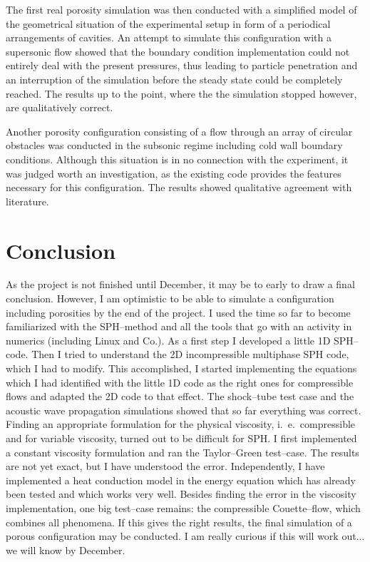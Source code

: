 \documentclass{report}
\begin{document}
The first real porosity simulation was then conducted with a simplified model of the geometrical situation of the experimental setup in form of a periodical arrangements of cavities. An attempt to simulate this configuration with a supersonic flow showed that the boundary condition implementation could not entirely deal with the present pressures, thus leading to particle penetration and an interruption of the simulation before the steady state could be completely reached. The results up to the point, where the the simulation stopped however, are qualitatively correct. 

Another porosity configuration consisting of a flow through an array of circular obstacles was conducted in the subsonic regime including cold wall boundary conditions. Although this situation is in no connection with the experiment, it was judged worth an investigation, as the existing code provides the features necessary for this configuration. The results showed qualitative agreement with literature.
 







 \chapter{Conclusion}
\label{sec:conclusion}
As the project is not finished until December, it may be to early to draw a final conclusion. However, I am optimistic to be able to simulate a configuration including porosities by the end of the project. I used the time so far to become familiarized with the SPH--method and all the tools that go with an activity in numerics (including Linux and Co.). As a first step I developed a little 1D SPH--code. Then I tried to understand the 2D incompressible multiphase SPH code, which I had to modify. This accomplished, I started implementing the equations which I had identified with the little 1D code as the right ones for compressible flows and adapted the 2D code to that effect. The shock--tube test case and the acoustic wave propagation simulations showed that so far everything was correct.
Finding an appropriate formulation for the physical viscosity, i.\ e.\ compressible and for variable viscosity, turned out to be difficult for SPH. I first implemented a constant viscosity formulation and ran the Taylor--Green test--case. The results are not yet exact, but I have understood the error. Independently, I have implemented a heat conduction model in the energy equation which has already been tested and which works very well.
Besides finding the error in the viscosity implementation, one big test--case remains: the compressible Couette--flow, which combines all phenomena.
If this gives the right results, the final simulation of a porous configuration may be conducted. I am really curious if this will work out... we will know by December.
\end{document}
